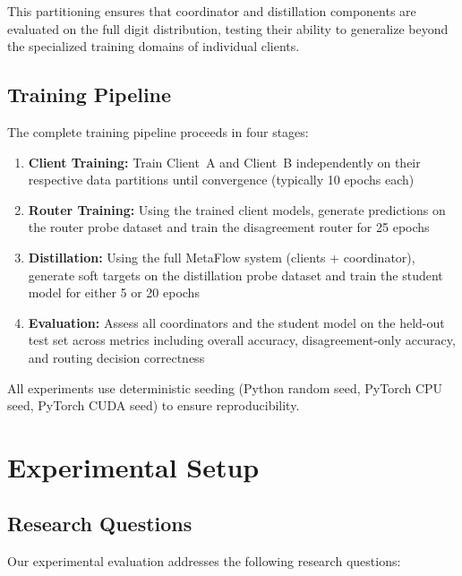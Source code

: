 \documentclass[12pt]{article}
\begin{document}
This partitioning ensures that coordinator and distillation components are evaluated on the full digit distribution, testing their ability to generalize beyond the specialized training domains of individual clients.

\subsection{Training Pipeline}
\label{subsec:training_pipeline}

The complete training pipeline proceeds in four stages:

\begin{enumerate}
    \item \textbf{Client Training:} Train Client~A and Client~B independently on their respective data partitions until convergence (typically 10 epochs each)
    
    \item \textbf{Router Training:} Using the trained client models, generate predictions on the router probe dataset and train the disagreement router for 25 epochs
    
    \item \textbf{Distillation:} Using the full MetaFlow system (clients + coordinator), generate soft targets on the distillation probe dataset and train the student model for either 5 or 20 epochs
    
    \item \textbf{Evaluation:} Assess all coordinators and the student model on the held-out test set across metrics including overall accuracy, disagreement-only accuracy, and routing decision correctness
\end{enumerate}

All experiments use deterministic seeding (Python random seed, PyTorch CPU seed, PyTorch CUDA seed) to ensure reproducibility.

\section{Experimental Setup}
\label{sec:experiments}

\subsection{Research Questions}

Our experimental evaluation addresses the following research questions:
\end{document}
